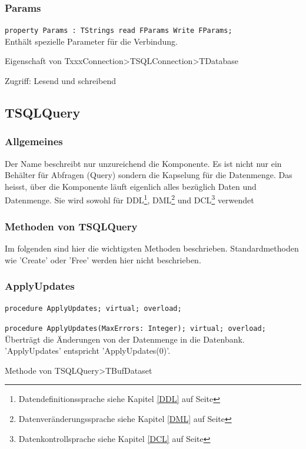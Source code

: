\subsubsection{Params}
\begin{description}
  \item \texttt{property Params : TStrings read FParams Write FParams;}\\Enthält spezielle Parameter für die Verbindung.
  \begin{description}
    \item Eigenschaft von TxxxConnection>TSQLConnection>TDatabase
  \end{description}
  \begin{description}
    \item Zugriff: Lesend und schreibend
  \end{description}
\end{description}



\subsection{TSQLQuery}
\subsubsection{Allgemeines}
Der Name beschreibt nur unzureichend die Komponente. Es ist nicht nur ein Behälter für Abfragen (Query) sondern die Kapselung für die Datenmenge. Das heisst, über die Komponente läuft eigenlich alles bezüglich Daten und Datenmenge. Sie wird sowohl für DDL\footnote{Datendefinitionssprache siehe Kapitel \ref{DDL} auf Seite \pageref{DCL}}, DML\footnote{Datenveränderungssprache siehe Kapitel \ref{DML} auf Seite \pageref{DCL}} und DCL\footnote{Datenkontrollsprache siehe Kapitel \ref{DCL} auf Seite \pageref{DCL}} verwendet


\subsubsection{Methoden von TSQLQuery}
Im folgenden sind hier die wichtigsten Methoden beschrieben. Standardmethoden wie 'Create' oder 'Free' werden hier nicht beschrieben.

\subsubsection{ApplyUpdates}
\begin{description}
  \item \texttt{procedure ApplyUpdates; virtual; overload;}
  \item \texttt{procedure ApplyUpdates(MaxErrors: Integer); virtual; overload;}\\Überträgt die Änderungen von der Datenmenge in die Datenbank. 'ApplyUpdates' entspricht 'ApplyUpdates(0)'.
  \begin{description}
    \item Methode von TSQLQuery>TBufDataset
  \end{description}
\end{description}

